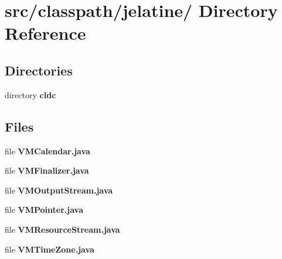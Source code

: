 \section{src/classpath/jelatine/ Directory Reference}
\label{dir_5e28a17aec8063fc6f362cebdf809f98}
\subsection*{Directories}
\begin{DoxyCompactItemize}
\item 
directory {\bf cldc}
\end{DoxyCompactItemize}
\subsection*{Files}
\begin{DoxyCompactItemize}
\item 
file {\bfseries VMCalendar.java}
\item 
file {\bfseries VMFinalizer.java}
\item 
file {\bfseries VMOutputStream.java}
\item 
file {\bfseries VMPointer.java}
\item 
file {\bfseries VMResourceStream.java}
\item 
file {\bfseries VMTimeZone.java}
\end{DoxyCompactItemize}
